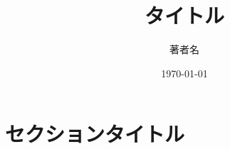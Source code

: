 \documentclass[11pt, a4paper, uplatex]{jsarticle}
\author[1]{著者名}
\affil[1]{所属}
\title{タイトル}
\date{\today}
\begin{document}
	\maketitle

   \thispagestyle{fancy}
	 \lhead{}
	 \rhead{\today}



\section{セクションタイトル}






%  
\end{document}
